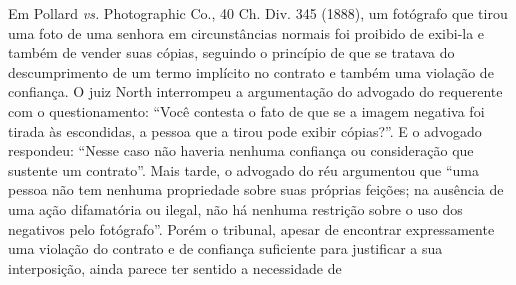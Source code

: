 Em Pollard \emph{vs.} Photographic Co., 40 Ch. Div. 345 (1888), um
fotógrafo que tirou uma foto de uma senhora em circunstâncias normais
foi proibido de exibi-la e também de vender suas cópias, seguindo o
princípio de que se tratava do descumprimento de um termo implícito no
contrato e também uma violação de confiança. O juiz North interrompeu a
argumentação do advogado do requerente com o questionamento: ``Você
contesta o fato de que se a imagem negativa foi tirada às escondidas, a
pessoa que a tirou pode exibir cópias?''. E o advogado respondeu:
``Nesse caso não haveria nenhuma confiança ou consideração que sustente
um contrato''. Mais tarde, o advogado do réu argumentou que ``uma pessoa
não tem nenhuma propriedade sobre suas próprias feições; na ausência de
uma ação difamatória ou ilegal, não há nenhuma restrição sobre o uso dos
negativos pelo fotógrafo''. Porém o tribunal, apesar de encontrar
expressamente uma violação do contrato e de confiança suficiente para
justificar a sua interposição, ainda parece ter sentido a necessidade de

